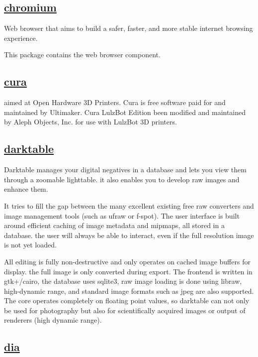\subsection{\href{http://www.chromium.org/Home}{chromium}}

 Web browser that aims to build a safer, faster, and more stable internet
 browsing experience.
 
 This package contains the web browser component.

\subsection{\href{}{cura}}

 aimed at Open Hardware 3D Printers. Cura is free software paid for
 and maintained by Ultimaker. Cura LulzBot Edition been modified and maintained by Aleph Objects, Inc. for use with LulzBot 3D printers.

\subsection{\href{http://www.darktable.org/}{darktable}}

 Darktable manages your digital negatives in a database and lets you view
 them  through a zoomable lighttable. it also enables you to develop raw
 images and enhance them.
 
 It tries to fill the gap between the many excellent existing free
 raw converters and image management tools (such as ufraw or f-spot).
 The user interface is built around efficient caching of image metadata and
 mipmaps, all stored in a database. the user will always be able to interact,
 even if the full resolution image is not yet loaded.
 
 All editing is fully non-destructive and only operates on cached image
 buffers for display. the full image is only converted during export. The
 frontend is written in gtk+/cairo, the database uses sqlite3, raw image
 loading is done using libraw, high-dynamic range, and standard image formats
 such as jpeg are also supported. The core operates completely on floating
 point values, so darktable can not only be used for photography but also for
 scientifically acquired images or output of renderers (high dynamic range).

\subsection{\href{http://live.gnome.org/Dia}{dia}}

